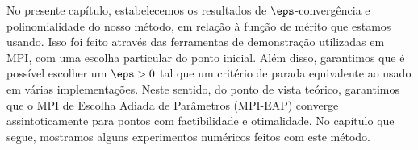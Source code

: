 No presente capítulo, estabelecemos os resultados de $\eps$-convergência e polinomialidade do nosso método, em relação à função de mérito que estamos usando. Isso foi feito através das ferramentas de demonstração utilizadas em \acl{MPI}, com uma escolha particular do ponto inicial. Além disso, garantimos que é possível escolher um $\eps>0$ tal que um critério de parada equivalente ao usado em várias implementações. Neste sentido, do ponto de vista teórico,  garantimos que o \ac{MPI} de Escolha Adiada de Parâmetros (MPI-EAP) converge assintoticamente para pontos com factibilidade e otimalidade. No capítulo que segue, mostramos alguns experimentos numéricos feitos com este método.







